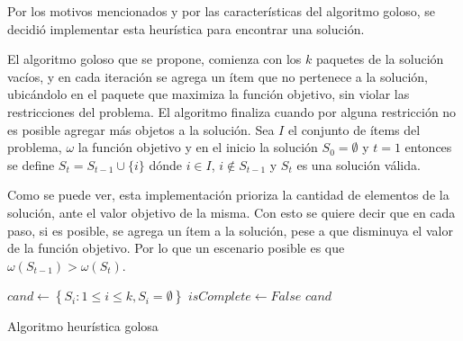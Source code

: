 Por los motivos mencionados y por las características del algoritmo goloso, se decidió implementar esta heurística para encontrar una solución. 

El algoritmo goloso que se propone, comienza con los $k$ paquetes de la solución vacíos, y en cada iteración se agrega un ítem que no pertenece a la solución, ubicándolo en el paquete que maximiza la función objetivo, sin violar las restricciones del problema. El algoritmo finaliza cuando por alguna restricción no es posible agregar más objetos a la solución. Sea $I$ el conjunto de ítems del problema, $\omega$ la función objetivo y en el inicio la solución $S_0 = \emptyset$ y $t=1$ entonces se define $S_t = S_{t-1} \cup \{i\}$ dónde $i \in I$, $i \notin S_{t-1}$ y $S_t$ es una solución válida. 

Como se puede ver, esta implementación prioriza la cantidad de elementos de la solución, ante el valor objetivo de la misma. Con esto se quiere decir que en cada paso, si es posible, se agrega un ítem a la solución, pese a que disminuya el valor de la función objetivo. Por lo que un escenario posible es que $\omega(S_{t-1}) > \omega(S_t)$.

\begin{center}
	\begin{algorithm}[H]
	\DontPrintSemicolon
	\SetAlgoLined
		$cand \leftarrow \left\{S_i: 1 \leq i \leq k, S_i = \emptyset\right\}$\;
		$isComplete \leftarrow False$\;
		\Return $cand$\;
	\caption{Algoritmo heurística golosa}\label{alg:algHeuGol}
	\end{algorithm}
\end{center}

